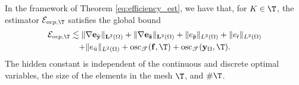 \documentclass[final]{siamart0216}
\begin{document}
\begin{theorem}\label{eq:efficiency_ocp}
In the framework of Theorem \ref{eq:efficiency_est}, we have that, for $K\in\T$, the estimator $\mathcal{E}_{ocp,\T}$ satisfies the global bound
\begin{multline}\label{eq:efficiency_estimates_ocp}
\mathcal{E}_{ocp,\T} \lesssim\|\nabla \mathbf{e}_{\bar{\mathbf{y}}} \|_{\mathbf{L}^2(\Omega)}+\|\nabla \mathbf{e}_{\bar{\mathbf{z}}} \|_{\mathbf{L}^2(\Omega)}+\| e_{\bar{\mathsf{p}}} \|_{L^2(\Omega)}+\| e_{\bar{\mathsf{r}}} \|_{L^2(\Omega)}\\+\|e_{\bar{u}}\|_{L^2(\Omega)}
+
\mathrm{osc}_{\mathscr{T}}(\mathbf{f},\T)
+
\mathrm{osc}_{\mathscr{T}}(\mathbf{y}_{\Omega},\T).
\end{multline}
The hidden constant is independent of the continuous and discrete optimal variables, the size of the elements in the mesh $\T$, and $\#\T$.
\end{theorem}
\end{document}
